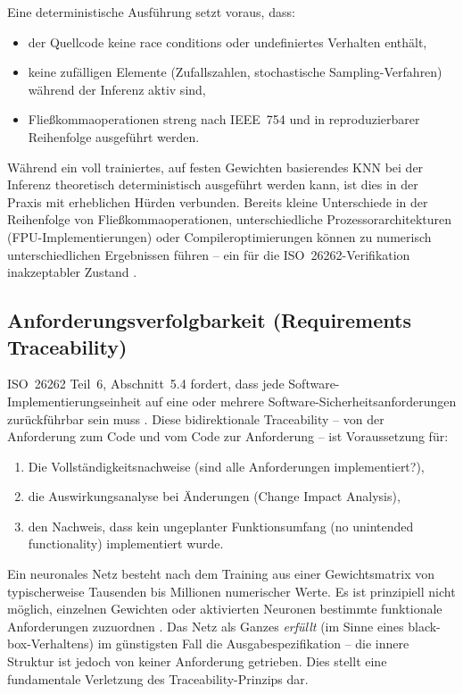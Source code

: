 ﻿\documentclass[12pt,a4paper]{article}
\begin{document}
Eine deterministische Ausf\"uhrung setzt voraus, dass:
\begin{itemize}
  \item der Quellcode keine race conditions oder undefiniertes Verhalten enth\"alt,
  \item keine zuf\"alligen Elemente (Zufallszahlen, stochastische Sampling-Verfahren)
    w\"ahrend der Inferenz aktiv sind,
  \item Flie\ss{}kommaoperationen streng nach IEEE~754 und in reproduzierbarer
    Reihenfolge ausgef\"uhrt werden.
\end{itemize}

W\"ahrend ein voll trainiertes, auf festen Gewichten basierendes KNN bei der
Inferenz theoretisch deterministisch ausgef\"uhrt werden kann, ist dies in der
Praxis mit erheblichen H\"urden verbunden. Bereits kleine Unterschiede in der
Reihenfolge von Flie\ss{}kommaoperationen, unterschiedliche Prozessorarchitekturen
(FPU-Implementierungen) oder Compileroptimierungen k\"onnen zu numerisch
unterschiedlichen Ergebnissen f\"uhren -- ein f\"ur die ISO~26262-Verifikation
inakzeptabler Zustand \cite{Dreossi2019}.

\subsection{Anforderungsverfolgbarkeit (Requirements Traceability)}
\label{subsec:traceability}

ISO~26262 Teil~6, Abschnitt~5.4 fordert, dass jede Software-Implementierungseinheit
auf eine oder mehrere Software-Sicherheitsanforderungen zur\"uckf\"uhrbar sein muss
\cite{iso26262_6}. Diese bidirektionale Traceability -- von der Anforderung zum
Code und vom Code zur Anforderung -- ist Voraussetzung f\"ur:

\begin{enumerate}
  \item Die Vollst\"andigkeitsnachweise (sind alle Anforderungen implementiert?),
  \item die Auswirkungsanalyse bei \"Anderungen (Change Impact Analysis),
  \item den Nachweis, dass kein ungeplanter Funktionsumfang (no unintended
    functionality) implementiert wurde.
\end{enumerate}

Ein neuronales Netz besteht nach dem Training aus einer Gewichtsmatrix von
typischerweise Tausenden bis Millionen numerischer Werte. Es ist prinzipiell
nicht m\"oglich, einzelnen Gewichten oder aktivierten Neuronen bestimmte funktionale
Anforderungen zuzuordnen \cite{Lipton2018}. Das Netz als Ganzes \emph{erf\"ullt}
(im Sinne eines black-box-Verhaltens) im g\"unstigsten Fall die Ausgabespezifikation --
die innere Struktur ist jedoch von keiner Anforderung getrieben. Dies stellt eine
fundamentale Verletzung des Traceability-Prinzips dar.
\end{document}
